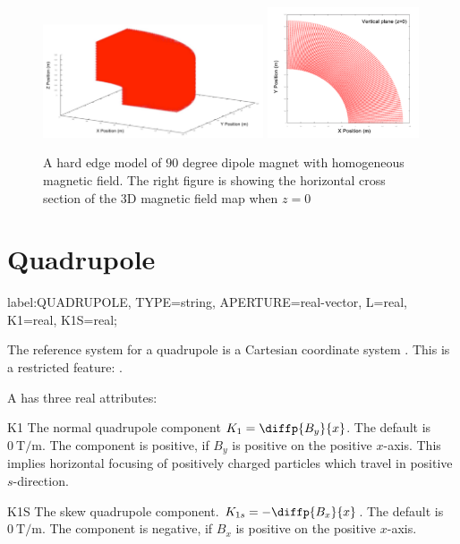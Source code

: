 \begin{figure}[tb]
\begin{center}
\includegraphics[width=0.58\textwidth]{figures/Elements/sbend3d-1}
\includegraphics[width=0.4\textwidth]{figures/Elements/sbend3d-2}
\end{center}
\caption{A hard edge model of $90$ degree dipole magnet with homogeneous magnetic field. The right figure
is showing the horizontal cross section of the 3D magnetic field map when $z = 0$}
\label{fig:sbend3d1}
\end{figure}



\clearpage
\section{Quadrupole}
\label{sec:quadrupole}
\begin{example}
label:QUADRUPOLE, TYPE=string, APERTURE=real-vector,
      L=real, K1=real, K1S=real;
\end{example}

The reference system for a quadrupole is a Cartesian coordinate system
. This is a restricted feature:  \noopalcycl.

A  has three real attributes:
\begin{kdescription}
\item[K1]
  The normal quadrupole component  $K_1=\diffp{B_y}{x}$.
  The default is $\SI{0}{\tesla\per\meter}$.
  The component is positive, if $B_y$ is positive on the positive $x$-axis.
  This implies horizontal focusing of positively charged particles which
  travel in positive $s$-direction.

\item[K1S]
  The skew quadrupole component. $K_{1s}=-\diffp{B_x}{x}$.
  The default is $\SI{0}{\tesla\per\meter}$.
  The component is negative, if $B_x$ is positive on the positive $x$-axis.
\end{kdescription}

